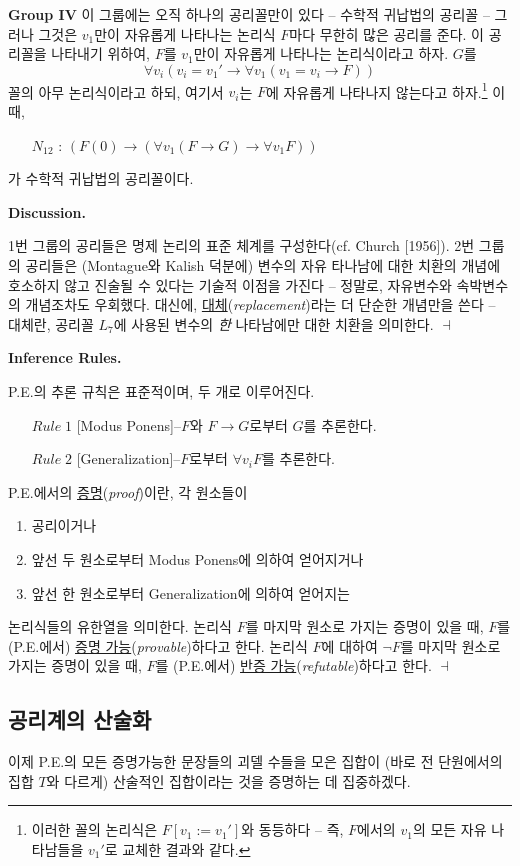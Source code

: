 \documentclass[12pt]{paper}
\newenvironment{context}[1][]
{ \noindent \textbf{{#1}.}
}
{ \hfill $ \dashv $
}
\begin{document}
  \noindent \textbf{Group IV}
  이 그룹에는 오직 하나의 공리꼴만이 있다 -- 수학적 귀납법의 공리꼴 --
  그러나 그것은 $v_1$만이 자유롭게 나타나는 논리식 $F$마다 무한히 많은 공리를 준다.
  이 공리꼴을 나타내기 위하여, $F$를 $v_1$만이 자유롭게 나타나는 논리식이라고 하자.
  $G$를 $$\forall v_i \left( v_i = v_1 ' \rightarrow \forall v_1 \left( v_1 = v_i \rightarrow F \right) \right)$$ 꼴의 아무 논리식이라고 하되,
  여기서 $v_i$는 $F$에 자유롭게 나타나지 않는다고 하자.\footnote
  {
    이러한 꼴의 논리식은 $F \left[ v_1 := v_1 ' \right]$와 동등하다 -- 즉, $F$에서의 $v_1$의 모든 자유 나타남들을 $v_1 '$로 교체한 결과와 같다.
  }
  이때,
  \begin{enumerate}
    \item[$N_{12}$ :] $\left( F \left( 0 \right) \rightarrow \left( \forall v_1 \left( F \rightarrow G \right) \rightarrow \forall v_1 F \right) \right)$
  \end{enumerate}
  가 수학적 귀납법의 공리꼴이다.

  \begin{context}[Discussion]
    1번 그룹의 공리들은 명제 논리의 표준 체계를 구성한다(cf. Church [1956]).
    2번 그룹의 공리들은 (Montague와 Kalish 덕분에) 변수의 자유 타나남에 대한 치환의 개념에 호소하지 않고 진술될 수 있다는 기술적 이점을 가진다 --
    정말로, 자유변수와 속박변수의 개념조차도 우회했다.
    대신에, \underline{대체}(\textit{replacement})라는 더 단순한 개념만을 쓴다 --
    대체란, 공리꼴 $L_{7}$에 사용된 변수의 \textit{한} 나타남에만 대한 치환을 의미한다.
  \end{context}

  \begin{context}[Inference Rules]
    P.E.의 추론 규칙은 표준적이며, 두 개로 이루어진다.
    \begin{itemize}[leftmargin=.5in]
      \item[$Rule \; \mathit{1}$] [Modus Ponens]--$F$와 $F \to G$로부터 $G$를 추론한다.
      \item[$Rule \; \mathit{2}$] [Generalization]--$F$로부터 $\forall v_{i} F$를 추론한다.
    \end{itemize}
    P.E.에서의 \underline{증명}(\textit{proof})이란,
    각 원소들이
    \begin{enumerate}
      \item 공리이거나
      \item 앞선 두 원소로부터 Modus Ponens에 의하여 얻어지거나
      \item 앞선 한 원소로부터 Generalization에 의하여 얻어지는
    \end{enumerate}
    논리식들의 유한열을 의미한다.
    논리식 $F$를 마지막 원소로 가지는 증명이 있을 때,
    $F$를 (P.E.에서) \underline{증명 가능}(\textit{provable})하다고 한다.
    논리식 $F$에 대하여 $\lnot F$를 마지막 원소로 가지는 증명이 있을 때,
    $F$를 (P.E.에서) \underline{반증 가능}(\textit{refutable})하다고 한다.
  \end{context}

  \subsection{공리계의 산술화}
  \hspace{12pt}

  이제 P.E.의 모든 증명가능한 문장들의 괴델 수들을 모은 집합이 (바로 전 단원에서의 집합 $T$와 다르게) 산술적인 집합이라는 것을 증명하는 데 집중하겠다.
\end{document}
